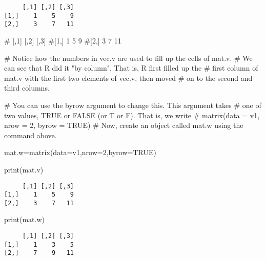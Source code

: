 \documentclass[
  letterpaper,
  DIV=11,
  numbers=noendperiod]{scrartcl}
\newenvironment{Shaded}{\begin{snugshade}}{\end{snugshade}}
\newcommand{\AttributeTok}[1]{\textcolor[rgb]{0.40,0.45,0.13}{#1}}
\newcommand{\CommentTok}[1]{\textcolor[rgb]{0.37,0.37,0.37}{#1}}
\newcommand{\ConstantTok}[1]{\textcolor[rgb]{0.56,0.35,0.01}{#1}}
\newcommand{\DecValTok}[1]{\textcolor[rgb]{0.68,0.00,0.00}{#1}}
\newcommand{\FunctionTok}[1]{\textcolor[rgb]{0.28,0.35,0.67}{#1}}
\newcommand{\NormalTok}[1]{\textcolor[rgb]{0.00,0.23,0.31}{#1}}
\newcommand{\OtherTok}[1]{\textcolor[rgb]{0.00,0.23,0.31}{#1}}
\begin{document}
\begin{verbatim}
     [,1] [,2] [,3]
[1,]    1    5    9
[2,]    3    7   11
\end{verbatim}

\begin{Shaded}
\begin{Highlighting}[]
\CommentTok{\#     [,1] [,2] [,3]}
\CommentTok{\#[1,]    1    5    9}
\CommentTok{\#[2,]    3    7   11}

\CommentTok{\# Notice how the numbers in vec.v are used to fill up the cells of mat.v.}
\CommentTok{\# We can see that R did it "by column". That is, R first filled up the }
\CommentTok{\# first column of mat.v with the first two elements of vec.v, then moved}
\CommentTok{\# on to the second and third columns. }




\CommentTok{\# You can use the byrow argument to change this. This argument takes }
\CommentTok{\# one of two values, TRUE or FALSE (or T or F). That is, we write}
\CommentTok{\# matrix(data = v1, nrow = 2, byrow = TRUE)}
\CommentTok{\# Now, create an object called mat.w using the command above. }


\NormalTok{mat.w}\OtherTok{=}\FunctionTok{matrix}\NormalTok{(}\AttributeTok{data=}\NormalTok{v1,}\AttributeTok{nrow=}\DecValTok{2}\NormalTok{,}\AttributeTok{byrow=}\ConstantTok{TRUE}\NormalTok{)}

\FunctionTok{print}\NormalTok{(mat.v)}
\end{Highlighting}
\end{Shaded}

\begin{verbatim}
     [,1] [,2] [,3]
[1,]    1    5    9
[2,]    3    7   11
\end{verbatim}

\begin{Shaded}
\begin{Highlighting}[]
\FunctionTok{print}\NormalTok{(mat.w)}
\end{Highlighting}
\end{Shaded}

\begin{verbatim}
     [,1] [,2] [,3]
[1,]    1    3    5
[2,]    7    9   11
\end{verbatim}
\end{document}

